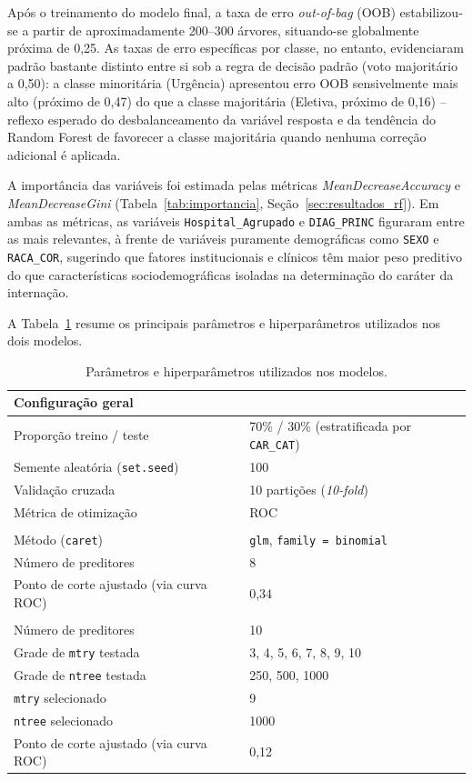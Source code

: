 \documentclass[12pt,a4paper]{article}
\begin{document}
Após o treinamento do modelo final, a taxa de erro \textit{out-of-bag} (OOB) estabilizou-se a partir de aproximadamente 200--300 árvores, situando-se globalmente próxima de 0,25. As taxas de erro específicas por classe, no entanto, evidenciaram padrão bastante distinto entre si sob a regra de decisão padrão (voto majoritário a 0,50): a classe minoritária (Urgência) apresentou erro OOB sensivelmente mais alto (próximo de 0,47) do que a classe majoritária (Eletiva, próximo de 0,16) -- reflexo esperado do desbalanceamento da variável resposta e da tendência do Random Forest de favorecer a classe majoritária quando nenhuma correção adicional é aplicada.

A importância das variáveis foi estimada pelas métricas \textit{MeanDecreaseAccuracy} e \textit{MeanDecreaseGini} (Tabela~\ref{tab:importancia}, Seção~\ref{sec:resultados_rf}). Em ambas as métricas, as variáveis \texttt{Hospital\_Agrupado} e \texttt{DIAG\_PRINC} figuraram entre as mais relevantes, à frente de variáveis puramente demográficas como \texttt{SEXO} e \texttt{RACA\_COR}, sugerindo que fatores institucionais e clínicos têm maior peso preditivo do que características sociodemográficas isoladas na determinação do caráter da internação.

A Tabela~\ref{tab:hiperparametros} resume os principais parâmetros e hiperparâmetros utilizados nos dois modelos.

\begin{table}[H]
\centering
\caption{Parâmetros e hiperparâmetros utilizados nos modelos.}
\label{tab:hiperparametros}
\begin{tabular}{p{6.3cm}p{7.2cm}}
\toprule
\multicolumn{2}{l}{\textbf{Configuração geral}} \\
\midrule
Proporção treino / teste & 70\% / 30\% (estratificada por \texttt{CAR\_CAT}) \\
Semente aleatória (\texttt{set.seed}) & 100 \\
Validação cruzada & 10 partições (\textit{10-fold}) \\
Métrica de otimização & ROC \\
\addlinespace
\multicolumn{2}{l}{\textbf{Regressão Logística}} \\
\midrule
Método (\texttt{caret}) & \texttt{glm}, \texttt{family = binomial} \\
Número de preditores & 8 \\
Ponto de corte ajustado (via curva ROC) & 0,34 \\
\addlinespace
\multicolumn{2}{l}{\textbf{Random Forest}} \\
\midrule
Número de preditores & 10 \\
Grade de \texttt{mtry} testada & 3, 4, 5, 6, 7, 8, 9, 10 \\
Grade de \texttt{ntree} testada & 250, 500, 1000 \\
\texttt{mtry} selecionado & 9 \\
\texttt{ntree} selecionado & 1000 \\
Ponto de corte ajustado (via curva ROC) & 0,12 \\
\bottomrule
\end{tabular}
\end{table}
\end{document}
